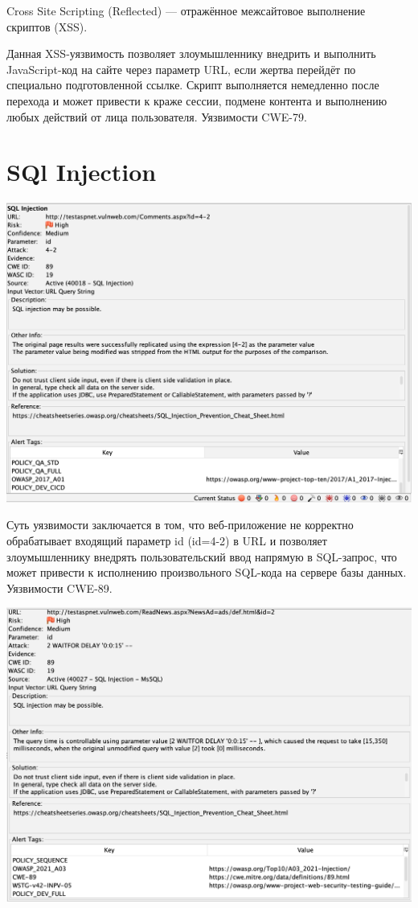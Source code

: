 \documentclass{article}
\begin{document}
Cross Site Scripting (Reflected) — отражённое межсайтовое выполнение скриптов (XSS). 

Данная XSS-уязвимость позволяет злоумышленнику внедрить и выполнить JavaScript-код на сайте через параметр URL, если жертва перейдёт по специально подготовленной ссылке. Скрипт выполняется немедленно после перехода и может привести к краже сессии, подмене контента и выполнению любых действий от лица пользователя.
Уязвимости CWE-79.
\section{SQl Injection}

\begin{center}
  \includegraphics[width=.9\textwidth]{2}
\end{center}

Суть уязвимости заключается в том, что веб-приложение не корректно обрабатывает входящий параметр id (id=4-2) в URL и позволяет злоумышленнику внедрять пользовательский ввод напрямую в SQL-запрос, что может привести к исполнению произвольного SQL-кода на сервере базы данных.
Уязвимости CWE-89.

\begin{center}
  \includegraphics[width=.9\textwidth]{3}
\end{center}
\end{document}
